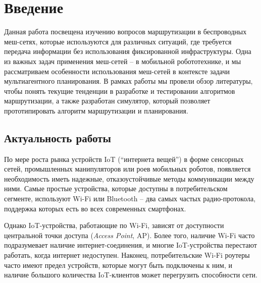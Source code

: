 \documentclass[%
]{report}
\begin{document}

\chapter{Введение}
\label{sec:intro}

Данная работа посвещена изучению вопросов маршрутизации в беспроводных меш-сетях,
которые используются для различных ситуаций, где требуется передача информации без использования фиксированной инфраструктуры.
Одна из важных задач применения меш-сетей -- в мобильной робототехнике,
и мы рассматриваем особенности использования меш-сетей в контексте задачи мультиагентного планирования.
В рамках работы мы провели обзор литературы, чтобы понять текущие тенденции в разработке и тестировании
алгоритмов маршрутизации,
а также разработан симулятор,
который позволяет прототипировать алгоритм маршрутизации и планирования.

\section{Актуальность работы}

По мере роста рынка устройств IoT (``интернета вещей'')
в форме сенсорных сетей, промышленных манипуляторов или роев мобильных роботов,
появляется необходимость иметь надежные, отказоустойчивые методы
коммуникации между ними.
Самые простые устройства, которые доступны в потребительском сегменте,
используют Wi-Fi или Bluetooth -- два самых частых радио-протокола,
поддержка которых есть во всех современных смартфонах.

Однако IoT-устройства, работающие по Wi-Fi, зависят от доступности центральной точки доступа (\emph{Access Point}, AP).
Более того, наличие Wi-Fi часто подразумевает наличие интернет-соединения,
и многие IoT-устройства перестают работать, когда интернет недоступен.
Наконец, потребительские Wi-Fi роутеры часто имеют предел устройств, которые могут быть подключены к ним,
и наличие большого количества IoT-клиентов может перегрузить способности сети.
\end{document}
